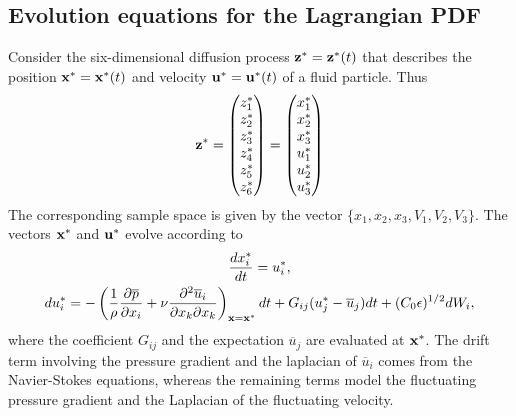 \documentclass[oneside,a4paper,11pt]{report}
\newcommand{\pavg}{\overline{p}}
\newcommand{\uavg}{\overline{u}}
\begin{document}
\subsection{Evolution equations for the Lagrangian PDF}

Consider the six-dimensional diffusion process $\mathbf{z}^* = \mathbf{z}^*(t)$  that describes the position $\mathbf{x}^* = \mathbf{x}^*(t)$ and velocity $\mathbf{u}^* = \mathbf{u}^*(t)$ of a fluid particle. Thus
\begin{equation}
\mathbf{z}^* = \begin{pmatrix}
  z_1^* \\
  z_2^* \\
  z_3^* \\
  z_4^* \\
  z_5^* \\
  z_6^*
 \end{pmatrix}
=\begin{pmatrix}
  x_1^* \\
  x_2^* \\
  x_3^* \\
  u_1^* \\
  u_2^* \\
  u_3^*
 \end{pmatrix}
\end{equation}
The corresponding sample space is given by the vector $\{x_1, x_2, x_3, V_1, V_2, V_3\}$. The vectors $\mathbf{x}^*$ and $\mathbf{u}^*$ evolve according to
\begin{gather}
\frac{d x^*_i}{dt} = u^*_i, \\
du_i^* = -\left ( \frac{1}{\rho} \frac{\partial \pavg}{\partial x_i} + \nu \frac{\partial^2 \uavg_i}{\partial x_k \partial x_k} \right )_{\xvec = \xvec^*} dt + G_{ij} (u_j^* - \uavg_j) dt + (C_0 \epsilon)^{1/2} dW_i,
\end{gather} 
where the coefficient $G_{ij}$ and the expectation $\uavg_j$ are evaluated at $\mathbf{x}^*$. The drift term involving the pressure gradient and the laplacian of $\uavg_i$ comes from the Navier-Stokes equations, whereas the remaining terms model the fluctuating pressure gradient and the Laplacian of the fluctuating velocity.
\end{document}
